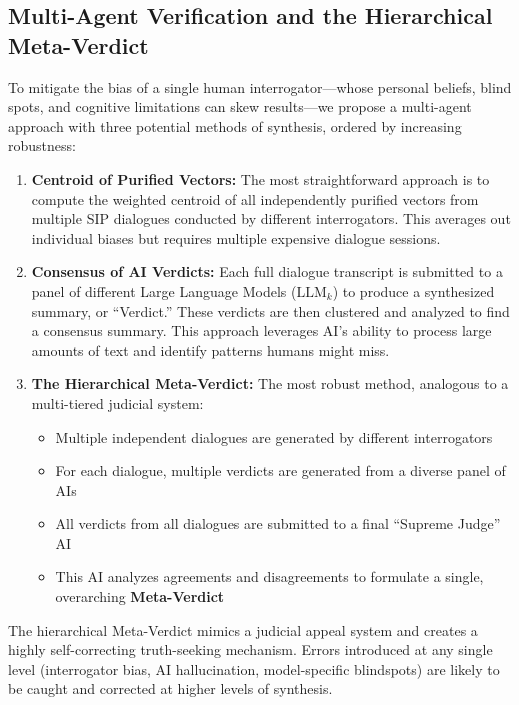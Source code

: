 \documentclass[11pt,a4paper]{article}
\begin{document}
\subsection{Multi-Agent Verification and the Hierarchical Meta-Verdict}

To mitigate the bias of a single human interrogator---whose personal beliefs, blind spots, and cognitive limitations can skew results---we propose a multi-agent approach with three potential methods of synthesis, ordered by increasing robustness:

\begin{enumerate}[leftmargin=*]
    \item \textbf{Centroid of Purified Vectors:} The most straightforward approach is to compute the weighted centroid of all independently purified vectors from multiple SIP dialogues conducted by different interrogators. This averages out individual biases but requires multiple expensive dialogue sessions.
    
    \item \textbf{Consensus of AI Verdicts:} Each full dialogue transcript is submitted to a panel of different Large Language Models ($\text{LLM}_k$) to produce a synthesized summary, or ``Verdict.'' These verdicts are then clustered and analyzed to find a consensus summary. This approach leverages AI's ability to process large amounts of text and identify patterns humans might miss.
    
    \item \textbf{The Hierarchical Meta-Verdict:} The most robust method, analogous to a multi-tiered judicial system:
    \begin{itemize}[nosep]
        \item Multiple independent dialogues are generated by different interrogators
        \item For each dialogue, multiple verdicts are generated from a diverse panel of AIs
        \item All verdicts from all dialogues are submitted to a final ``Supreme Judge'' AI
        \item This AI analyzes agreements and disagreements to formulate a single, overarching \textbf{Meta-Verdict}
    \end{itemize}
\end{enumerate}

The hierarchical Meta-Verdict mimics a judicial appeal system and creates a highly self-correcting truth-seeking mechanism. Errors introduced at any single level (interrogator bias, AI hallucination, model-specific blindspots) are likely to be caught and corrected at higher levels of synthesis.
\end{document}
